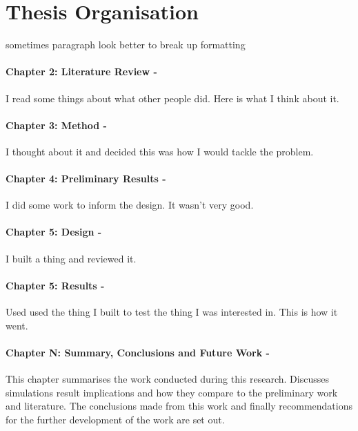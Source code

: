 \section{Thesis Organisation}

sometimes paragraph look better to break up formatting

\paragraph{Chapter 2: Literature Review -} I read some things about what other people did. Here is what I think about it.

\paragraph{Chapter 3: Method -} I thought about it and decided this was how I would tackle the problem.

\paragraph{Chapter 4: Preliminary Results -} I did some work to inform the design. It wasn't very good. 

\paragraph{Chapter 5: Design -} I built a thing and reviewed it.

\paragraph{Chapter 5: Results -} Used used the thing I built to test the thing I was interested in. This is how it went.

\paragraph{Chapter N: Summary, Conclusions and Future Work -}  This chapter summarises the work conducted during this research. Discusses simulations result implications and how they compare to the preliminary work and literature. The conclusions made from this work and finally recommendations for the further development of the work are set out.


